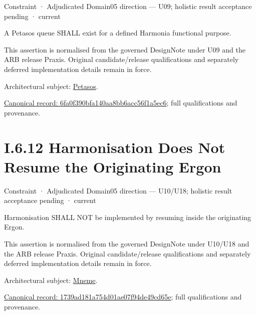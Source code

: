 \label{element:6fa0f390bfa140aa8bb6acc56f1a5ec6}
{\small Constraint · Adjudicated Domain05 direction — U09; holistic result acceptance pending · current}\par

A Petasos queue SHALL exist for a defined Harmonia functional purpose.



This assertion is normalised from the governed DesignNote under U09 and the ARB release Praxis. Original candidate/release qualifications and separately deferred implementation details remain in force.



Architectural subject: \hyperref[element:195e5f10db8e419391354197b5d7a8cc]{Petasos}.


{\footnotesize \href{../../../../continuum/motivation/constraint/6fa0f390bfa140aa8bb6acc56f1a5ec6.md}{Canonical record: 6fa0f390bfa140aa8bb6acc56f1a5ec6}; full qualifications and provenance.}\par
\section*{I.6.12 Harmonisation Does Not Resume the Originating Ergon}
\label{navigation:I.6.12}

\label{element:1739ad181a754d01ae07f94de49cd65e}
{\small Constraint · Adjudicated Domain05 direction — U10/U18; holistic result acceptance pending · current}\par

Harmonisation SHALL NOT be implemented by resuming inside the originating Ergon.



This assertion is normalised from the governed DesignNote under U10/U18 and the ARB release Praxis. Original candidate/release qualifications and separately deferred implementation details remain in force.



Architectural subject: \hyperref[element:1af8a56358f7429fabfb57be66542a99]{Mneme}.


{\footnotesize \href{../../../../continuum/motivation/constraint/1739ad181a754d01ae07f94de49cd65e.md}{Canonical record: 1739ad181a754d01ae07f94de49cd65e}; full qualifications and provenance.}\par
